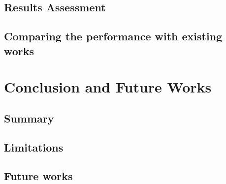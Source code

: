 \documentclass[letterpaper,12pt,titlepage,oneside,final]{book}
\begin{document}
\section{Results Assessment}

\section{Comparing the performance with existing works}

\chapter{Conclusion and Future Works}

\section{Summary}

\section{Limitations}

\section{Future works}


\appendix
\end{document}
